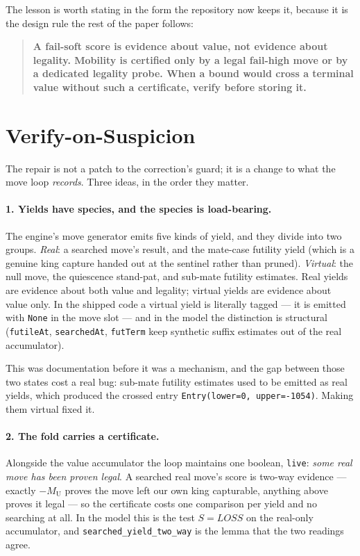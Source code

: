 \documentclass[11pt]{article}
\newcommand{\MU}{M_{\mathrm{U}}}    %
\newcommand{\LOSS}{\mathit{LOSS}}   %
\theoremstyle{plain}
\theoremstyle{definition}
\theoremstyle{remark}
\begin{document}
The lesson is worth stating in the form the repository now keeps it,
because it is the design rule the rest of the paper follows:

\begin{quote}
\textbf{A fail-soft score is evidence about value, not evidence about
legality.  Mobility is certified only by a legal fail-high move or by a
dedicated legality probe.  When a bound would cross a terminal value
without such a certificate, verify before storing it.}
\end{quote}

\section{Verify-on-Suspicion}
\label{sec:verify}

The repair is not a patch to the correction's guard; it is a change to
what the move loop \emph{records}.  Three ideas, in the order they
matter.

\paragraph{1. Yields have species, and the species is load-bearing.}
The engine's move generator emits five kinds of yield, and they divide
into two groups.  \emph{Real}: a searched move's result, and the
mate-case futility yield (which is a genuine king capture handed out at
the sentinel rather than pruned).  \emph{Virtual}: the null move, the
quiescence stand-pat, and sub-mate futility estimates.  Real yields are
evidence about both value and legality; virtual yields are evidence
about value only.  In the shipped code a virtual yield is literally
tagged --- it is emitted with \texttt{None} in the move slot --- and in
the model the distinction is structural (\texttt{futileAt},
\texttt{searchedAt}, \texttt{futTerm} keep synthetic suffix estimates
out of the real accumulator).

This was documentation before it was a mechanism, and the gap between
those two states cost a real bug: sub-mate futility estimates used to
be emitted as real yields, which produced the crossed entry
\texttt{Entry(lower=0, upper=-1054)}.  Making them virtual fixed it.

\paragraph{2. The fold carries a certificate.}
Alongside the value accumulator the loop maintains one boolean,
\texttt{live}: \emph{some real move has been proven legal}.  A searched
real move's score is two-way evidence --- exactly $-\MU$ proves the
move left our own king capturable, anything above proves it legal ---
so the certificate costs one comparison per yield and no searching at
all.  In the model this is the test $S = \LOSS$ on the real-only
accumulator, and \texttt{searched\_yield\_two\_way} is the lemma that
the two readings agree.
\end{document}
